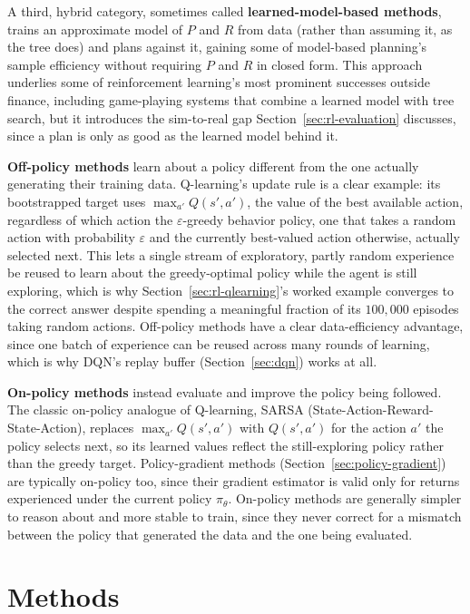 \documentclass[../ai_in_finance]{subfiles}
\begin{document}
A third, hybrid category, sometimes called \textbf{learned-model-based methods}, trains an approximate model of $P$ and $R$ from data (rather than assuming it, as the tree does) and plans against it, gaining some of model-based planning's sample efficiency without requiring $P$ and $R$ in closed form. This approach underlies some of reinforcement learning's most prominent successes outside finance, including game-playing systems that combine a learned model with tree search, but it introduces the sim-to-real gap Section~\ref{sec:rl-evaluation} discusses, since a plan is only as good as the learned model behind it.

\textbf{Off-policy methods} learn about a policy different from the one actually generating their training data. Q-learning's 
update rule is a clear example: its bootstrapped target uses $\max_{a'} Q(s',a')$, the value of the best available action, 
regardless of which action the 
$\varepsilon$-greedy behavior policy, one that takes a random action with probability $\varepsilon$ and the currently 
best-valued action otherwise, actually selected next. This lets a single stream of exploratory, partly random experience be 
reused to learn about the greedy-optimal policy while the agent is still exploring, which is why 
Section~\ref{sec:rl-qlearning}'s worked example converges to the correct answer despite spending a meaningful 
fraction of its $100{,}000$ episodes taking random actions. Off-policy methods have a clear data-efficiency 
advantage, since one batch of experience can be reused across many rounds of learning, which is why DQN's replay buffer 
(Section~\ref{sec:dqn}) works at all.

\textbf{On-policy methods} instead evaluate and improve the policy being followed. The classic on-policy analogue of Q-learning, SARSA (State-Action-Reward-State-Action), replaces $\max_{a'} Q(s',a')$ with $Q(s',a')$ for the action $a'$ the policy selects next, so its learned values reflect the still-exploring policy rather than the greedy target. Policy-gradient methods (Section~\ref{sec:policy-gradient}) are typically on-policy too, since their gradient estimator is valid only for returns experienced under the current policy $\pi_\theta$. On-policy methods are generally simpler to reason about and more stable to train, since they never correct for a mismatch between the policy that generated the data and the one being evaluated.

\section{Methods}
\end{document}
